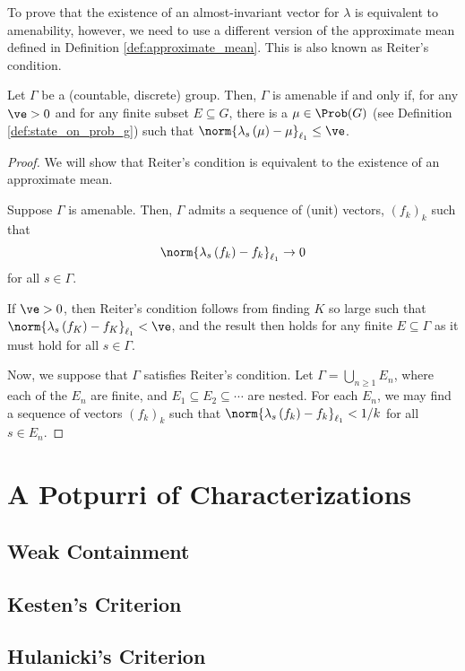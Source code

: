 To prove that the existence of an almost-invariant vector for $\lambda$ is equivalent to amenability, however, we need to use a different version of the approximate mean defined in Definition \ref{def:approximate_mean}. This is also known as Reiter's condition.
\begin{theorem}
  Let $\Gamma$ be a (countable, discrete) group. Then, $\Gamma$ is amenable if and only if, for any $\ve > 0$ and for any finite subset $E\subseteq G$, there is a $\mu\in \Prob(G)$ (see Definition \ref{def:state_on_prob_g}) such that $\norm{\lambda_s\left( \mu \right) - \mu}_{\ell_1} \leq \ve$.
\end{theorem}
\begin{proof}
  We will show that Reiter's condition is equivalent to the existence of an approximate mean.\newline

  Suppose $\Gamma$ is amenable. Then, $\Gamma$ admits a sequence of (unit) vectors, $\left( f_k \right)_k$ such that 
  \begin{align*}
    \norm{\lambda_s\left( f_k \right) - f_k}_{\ell_1}\rightarrow 0
  \end{align*}
   for all $s\in\Gamma$.\newline

   If $\ve > 0$, then Reiter's condition follows from finding $K$ so large such that $\norm{\lambda_s\left( f_K \right) - f_K}_{\ell_1} < \ve$, and the result then holds for any finite $E\subseteq \Gamma$ as it must hold for all $s\in \Gamma$.\newline

  Now, we suppose that $\Gamma$ satisfies Reiter's condition. Let $\Gamma = \bigcup_{n\geq 1}E_n$, where each of the $E_n$ are finite, and $E_1\subseteq E_2\subseteq \cdots$ are nested. For each $E_n$, we may find a sequence of vectors $\left( f_k \right)_k$ such that $\norm{\lambda_s\left( f_k \right) - f_k}_{\ell_1} < 1/k$ for all $s\in E_n$.
\end{proof}

\section{A Potpurri of Characterizations}%
\subsection{Weak Containment}%
\subsection{Kesten's Criterion}%
\subsection{Hulanicki's Criterion}%
